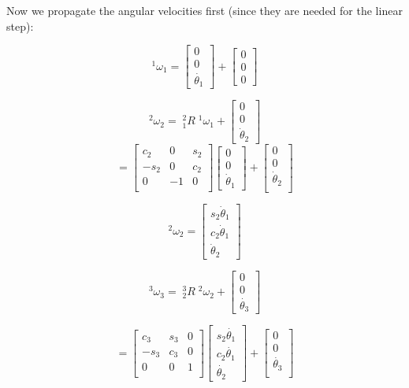 \begin{Example}
Now we propagate the angular velocities first (since they are needed for the linear step):

\[
^1\omega_1 =
\left[
\begin{array}{c}
0  \\ 0  \\ \dot{\theta_1}
\end{array}
\right ]
+
\begin{bmatrix}
0\\0\\0
\end{bmatrix}
\]

\[
^2\omega_2 =
\;^2_1R\;^1\omega_1 +
\left[
\begin{array}{c}
0  \\ 0  \\ \dot{\theta}_2
\end{array}
\right ]
\]
\[
=
\left [
\begin{array}{ccc}
c_2	& 0	& s_2	 	\\
-s_2	& 0	& c_2	 	\\
0	& -1	& 0	 	\\
\end{array}
\right ]
\left[
\begin{array}{c}
0  \\ 0 \\ \dot{\theta}_1
\end{array}
\right ]
+
\left[
\begin{array}{c}
0  \\ 0  \\ \dot{\theta}_2 \\
\end{array}
\right ]
\]

\[
^2\omega_2 =  \left[
\begin{array}{c}
s_2\dot{\theta}_1  \\ c_2\dot{\theta}_1 \\ \dot{\theta}_2
\end{array}
\right ]
\]

\[
^3\omega_3 =
\;^3_2R\;^2\omega_2 +
\left[
\begin{array}{c}
0  \\ 0  \\ \dot{\theta_3}
\end{array}
\right ]
\]

\[
=
\left [
\begin{array}{ccc}
c_3	& s_3	& 0		\\
-s_3	& c_3	& 0		\\
0	& 0	& 1		\\
\end{array}
\right ]
\left[
\begin{array}{c}
s_2\dot{\theta_1}  \\ c_2\dot{\theta_1} \\ \dot{\theta_2}
\end{array}
\right ]
+
\left[
\begin{array}{c}
0  \\ 0  \\ \dot{\theta_3} \\
\end{array}
\right ]
\]


\end{Example}
